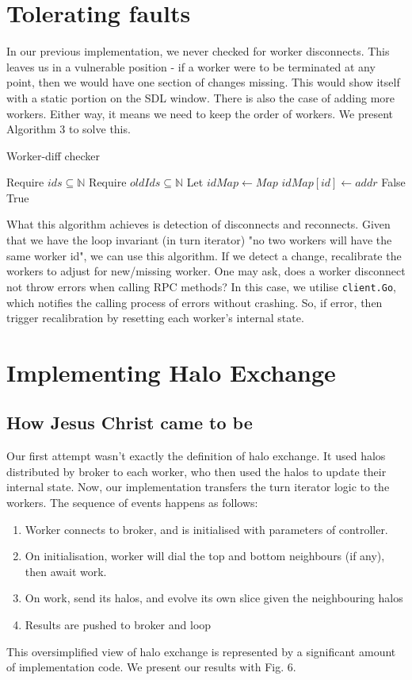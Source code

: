 \documentclass[twoside,twocolumn]{article}
\begin{document}
\section{Tolerating faults}
In our previous implementation, we never checked for worker disconnects. This leaves us in a vulnerable
position - if a worker were to be terminated at any point, then we would have one section of changes missing.
This would show itself with a static portion on the SDL window. There is also the case of adding more workers. Either
way, it means we need to keep the order of workers. We present Algorithm 3 to solve this.
\begin{algorithm}
  \caption{Worker-diff checker}
  \begin{algorithmic}
    \State Require $ids \subseteq \mathbb{N}$
    \State Require $oldIds \subseteq \mathbb{N}$ 
    \State Let $idMap \gets Map$
      \State $idMap[id] \gets addr$
    \EndFor
      \State \Return False
      \EndIf
    \EndFor
    \State \Return True
  \end{algorithmic}
\end{algorithm}


What this algorithm achieves is detection of disconnects and reconnects.
Given that we have the loop invariant (in turn iterator) "no two workers will have the same worker id",
we can use this algorithm. If we detect a change, recalibrate the workers to adjust for new/missing worker. 
One may ask, does a worker disconnect not throw errors when calling RPC methods? In this case, we utilise \texttt{client.Go},
which notifies the calling process of errors without crashing. So, if error, then trigger recalibration by resetting each worker's
internal state.

\section{Implementing Halo Exchange}
\subsection{How Jesus Christ came to be}
Our first attempt wasn't exactly the definition of halo exchange. It used halos distributed by broker to
each worker, who then used the halos to update their internal state. Now, our implementation transfers the turn iterator
logic to the workers. The sequence of events happens as follows:
\begin{enumerate}[noitemsep]
  \item Worker connects to broker, and is initialised with parameters of controller.
  \item On initialisation, worker will dial the top and bottom neighbours (if any), then await work.
  \item On work, send its halos, and evolve its own slice given the neighbouring halos
  \item Results are pushed to broker and loop
\end{enumerate}
This oversimplified view of halo exchange is represented by a significant amount of implementation code.
We present our results with Fig. 6.
\end{document}
